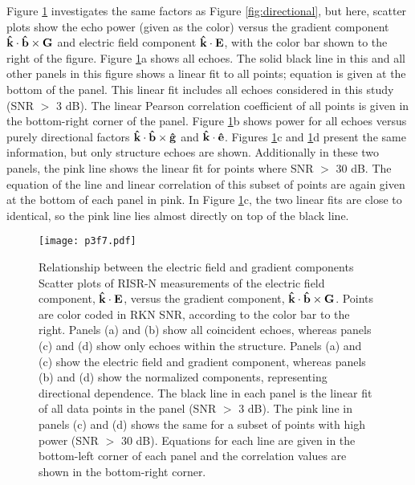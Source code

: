 Figure \ref{fig:eg_scatter} investigates the same factors as Figure \ref{fig:directional}, but here, scatter plots show the echo power (given as the color) versus the gradient component \(\mathbf{\hat{k}}\cdot\mathbf{\hat{b}}\times\mathbf{G}\) and electric field component \(\mathbf{\hat{k}}\cdot\mathbf{E}\), with the color bar shown to the right of the figure.  Figure \ref{fig:eg_scatter}a shows all echoes.  The solid black line in this and all other panels in this figure shows a linear fit to all points; equation is given at the bottom of the panel.  This linear fit includes all echoes considered in this study (SNR $>$ 3 dB).  The linear Pearson correlation coefficient of all points is given in the bottom-right corner of the panel.  Figure \ref{fig:eg_scatter}b shows power for all echoes versus purely directional factors \(\mathbf{\hat{k}}\cdot\mathbf{\hat{b}}\times\mathbf{\hat{g}}\) and \(\mathbf{\hat{k}}\cdot\mathbf{\hat{e}}\).  Figures \ref{fig:eg_scatter}c and \ref{fig:eg_scatter}d present the same information, but only structure echoes are shown.  Additionally in these two panels, the pink line shows the linear fit for points where SNR \(>\) 30 dB.  The equation of the line and linear correlation of this subset of points are again given at the bottom of each panel in pink.  In Figure \ref{fig:eg_scatter}c, the two linear fits are close to identical, so the pink line lies almost directly on top of the black line.

\begin{figure}
\texttt{[image: p3f7.pdf]}
  \caption[Relationship between the electric field and gradient components]{{\:}Relationship between the electric field and gradient components\\ Scatter plots of RISR-N measurements of the electric field component, \(\mathbf{\hat{k}}\cdot\mathbf{E}\), versus the gradient component, \(\mathbf{\hat{k}}\cdot\mathbf{\hat{b}}\times\mathbf{G}\).  Points are color coded in RKN SNR, according to the color bar to the right.  Panels (a) and (b) show all coincident echoes, whereas panels (c) and (d) show only echoes within the structure.  Panels (a) and (c) show the electric field and gradient component, whereas panels (b) and (d) show the normalized components, representing directional dependence.  The black line in each panel is the linear fit of all data points in the panel (SNR \(>\) 3 dB).  The pink line in panels (c) and (d) shows the same for a subset of points with high power (SNR \(>\) 30 dB).  Equations for each line are given in the bottom-left corner of each panel and the correlation values are shown in the bottom-right corner.}
  \label{fig:eg_scatter}
\end{figure}

